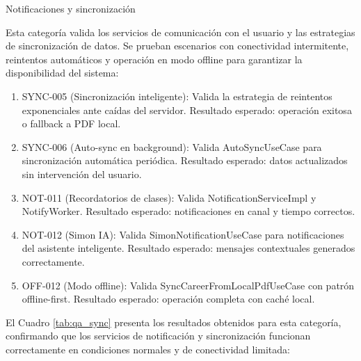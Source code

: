   \item Notificaciones y sincronización
  
  Esta categoría valida los servicios de comunicación con el usuario y las estrategias de sincronización de datos. Se prueban escenarios con conectividad intermitente, reintentos automáticos y operación en modo offline para garantizar la disponibilidad del sistema:
  
  \begin{enumerate}[label=\alph*)]
    \item SYNC-005 (Sincronización inteligente): Valida la estrategia de reintentos exponenciales ante caídas del servidor. Resultado esperado: operación exitosa o fallback a PDF local.
    
    \item SYNC-006 (Auto-sync en background): Valida AutoSyncUseCase para sincronización automática periódica. Resultado esperado: datos actualizados sin intervención del usuario.
    
    \item NOT-011 (Recordatorios de clases): Valida NotificationServiceImpl y NotifyWorker. Resultado esperado: notificaciones en canal y tiempo correctos.
    
    \item NOT-012 (Simon IA): Valida SimonNotificationUseCase para notificaciones del asistente inteligente. Resultado esperado: mensajes contextuales generados correctamente.
    
    \item OFF-012 (Modo offline): Valida SyncCareerFromLocalPdfUseCase con patrón offline-first. Resultado esperado: operación completa con caché local.
  \end{enumerate}
  
  El Cuadro \ref{tab:qa_sync} presenta los resultados obtenidos para esta categoría, confirmando que los servicios de notificación y sincronización funcionan correctamente en condiciones normales y de conectividad limitada:
  
